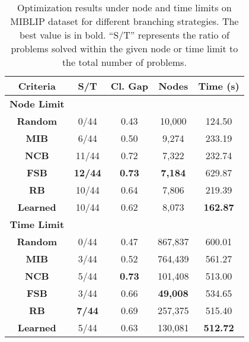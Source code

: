 \begin{table}[htb!]
    \centering
    \begin{tabular}{|c c c c c|}
        \hline
        \textbf{Criteria} & \textbf{S/T} & \textbf{Cl. Gap} & \textbf{Nodes} & \textbf{Time (s)}\\
        \hline
        \textbf{Node Limit} & & & & \\
        \textbf{Random} & 0/44 & 0.43 & 10,000 & 124.50 \\
        \textbf{MIB} & 6/44 & 0.50 & 9,274 & 233.19 \\
        \textbf{NCB} & 11/44 & 0.72 & 7,322 & 232.74\\
        \textbf{FSB} & \textbf{12/44} & \textbf{0.73} & \textbf{7,184} & 629.87 \\
        \textbf{RB} & 10/44 & 0.64 & 7,806 & 219.39 \\
        \textbf{Learned} & 10/44 & 0.62 & 8,073 & \textbf{162.87}\\
        \hline
        \textbf{Time Limit} & & & & \\
        \textbf{Random} & 0/44 & 0.47 & 867,837 & 600.01 \\
        \textbf{MIB} & 3/44 & 0.52 & 764,439 & 561.27\\
        \textbf{NCB} & 5/44 & \textbf{0.73} & 101,408 & 513.00 \\
        \textbf{FSB} & 3/44 & 0.66 & \textbf{49,008} & 534.65 \\
        \textbf{RB} & \textbf{7/44} & 0.69 & 257,375 & 515.40\\
        \textbf{Learned} & 5/44 & 0.63 & 130,081 & \textbf{512.72} \\
        \hline
    \end{tabular}
    \caption{Optimization results under node and time limits on MIBLIP dataset for different branching strategies.
    The best value is in bold.
    “S/T” represents the ratio of problems solved within the given node or time limit to the total number of problems.}
    \label{tab:alvarez-results}
\end{table}
